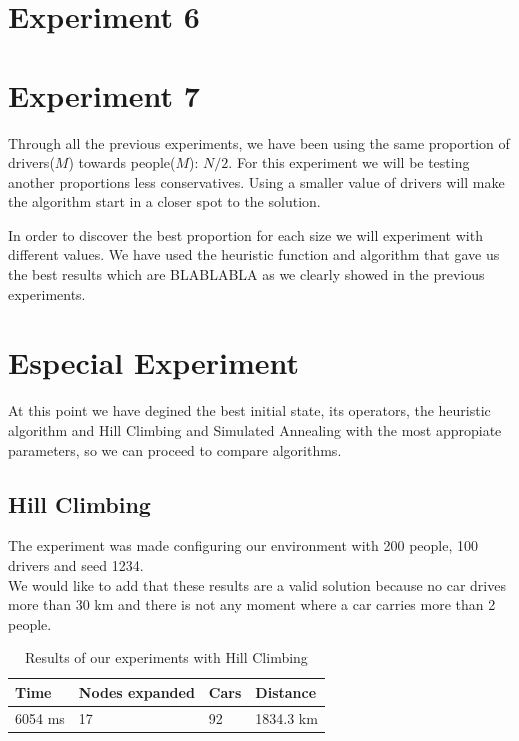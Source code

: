 \documentclass[12]{article}
\begin{document}

\section{Experiment 6}



\section{Experiment 7}
Through all the previous experiments, we have been using the same proportion of drivers($M$) towards people($M$): $N/2$. For this experiment we will be testing another proportions less conservatives. Using a smaller value of drivers will make the algorithm start in a closer spot to the solution.

In order to discover the best proportion for each size we will experiment with different values. We have used the heuristic function and algorithm that gave us the best results which are BLABLABLA as we clearly showed in the previous experiments. 



\section{Especial Experiment}

At this point we have degined the best initial state, its operators, the heuristic algorithm and Hill Climbing and Simulated Annealing with the most appropiate parameters, so we can proceed to compare algorithms. 


\subsection{Hill Climbing}

The experiment was made configuring our environment with 200 people, 100 drivers and seed 1234.
\\

We would like to add that these results are a valid solution because no car drives more than 30 km and there is not any moment where a car carries more than 2 people. 
\\

\begin{table}[h]
\centering
\begin{tabular}{|l|l|l|l|}
\hline \textbf{Time} &
 \textbf{Nodes expanded} & \textbf{Cars} & \textbf{Distance}\\  \hline
6054 ms &  17 & 92 & 1834.3 km \\ \hline
\end{tabular}
\caption{Results of our experiments with Hill Climbing}
\label{Results}
\end{table}
\end{document}
